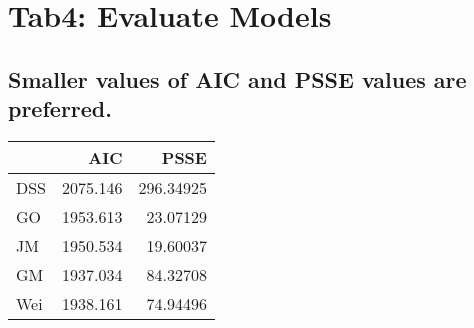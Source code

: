 \documentclass[]{article}
\begin{document}
\section{Tab4: Evaluate Models}\label{tab4-evaluate-models}

\subsection{Smaller values of AIC and PSSE values are
preferred.}\label{smaller-values-of-aic-and-psse-values-are-preferred.}

\begin{longtable}[]{@{}lrr@{}}
\toprule
& AIC & PSSE\tabularnewline
\midrule
\endhead
DSS & 2075.146 & 296.34925\tabularnewline
GO & 1953.613 & 23.07129\tabularnewline
JM & 1950.534 & 19.60037\tabularnewline
GM & 1937.034 & 84.32708\tabularnewline
Wei & 1938.161 & 74.94496\tabularnewline
\bottomrule
\end{longtable}
\end{document}
